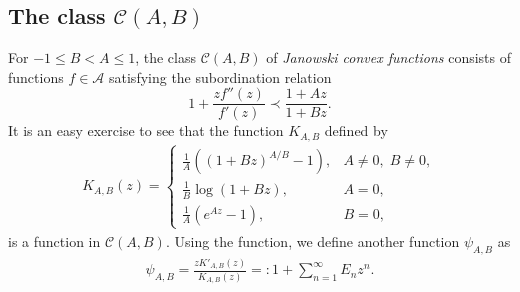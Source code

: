 \documentclass[a4paper,12pt]{amsart}
\theoremstyle{definition}
\newenvironment{customthm}[1]
  {\renewcommand\theinnercustomthm{#1}\innercustomthm}
  {\endinnercustomthm}
\begin{document}
\subsection{The class $\mathcal{C}(A,B)$}
 For \(-1 \leq B < A \leq 1\), the class \(\mathcal{C}(A,B)\) of \emph{Janowski convex functions} consists of functions \(f \in \mathcal{A}\) satisfying the subordination relation
\[
1 + \frac{zf''(z)}{f'(z)} \prec \frac{1 + Az}{1 + Bz}.
\]
It is an easy exercise to see that the function $K_{A,B}$ defined by
\begin{align}\label{T-fun-10}
K_{A,B}(z) =
\begin{cases}
\displaystyle \frac{1}{A} \left( (1+Bz)^{A/B} - 1 \right), & A \neq 0, \; B \neq 0, \\[10pt]
\displaystyle \frac{1}{B} \log(1+Bz), & A = 0, \\[10pt]
\displaystyle \frac{1}{A} \left( e^{Az} - 1 \right), & B = 0,
\end{cases}
\end{align}
is a function in $\mathcal{C}(A,B)$. Using the function, we define another function $\psi_{A,B}$ as 
\begin{align}\label{T-70}
    \psi_{A,B}=\frac{zK'_{A,B}(z)}{K_{A,B}(z)}=: 1+\sum_{n=1}^{\infty}E_nz^n.
\end{align}









\end{document}
